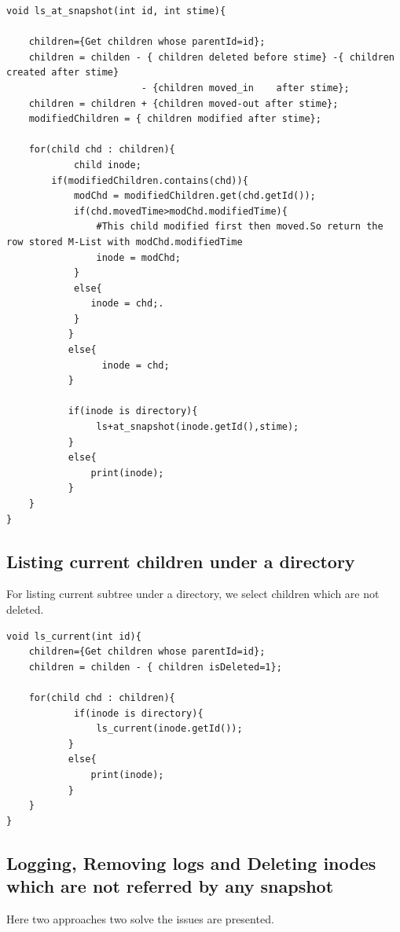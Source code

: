 \begin{verbatim}
void ls_at_snapshot(int id, int stime){

    children={Get children whose parentId=id};
    children = childen - { children deleted before stime} -{ children created after stime} 
                        - {children moved_in 	after stime};
    children = children + {children moved-out after stime};
    modifiedChildren = { children modified after stime};

    for(child chd : children){
    	    child inode;
        if(modifiedChildren.contains(chd)){
            modChd = modifiedChildren.get(chd.getId());
            if(chd.movedTime>modChd.modifiedTime){
                #This child modified first then moved.So return the row stored M-List with modChd.modifiedTime
                inode = modChd;             
            }
            else{
               inode = chd;.
            }
    	   }
    	   else{
    	         inode = chd;
    	   }
    	   
    	   if(inode is directory){
    	        ls+at_snapshot(inode.getId(),stime);
    	   }
    	   else{
    	       print(inode);
    	   }
    }
}

\end{verbatim}

\subsection{Listing current children under a directory }
For listing current subtree under a directory, we select children which are not deleted.\\
\begin{verbatim}
void ls_current(int id){
    children={Get children whose parentId=id};
    children = childen - { children isDeleted=1}; 

    for(child chd : children){
    	    if(inode is directory){
    	        ls_current(inode.getId());
    	   }
    	   else{
    	       print(inode);
    	   }
    }
}
\end{verbatim}

\subsection{Logging, Removing logs and Deleting inodes which are not referred by any snapshot}
\label{loggingApproaches}
Here two approaches two solve the issues are presented.
